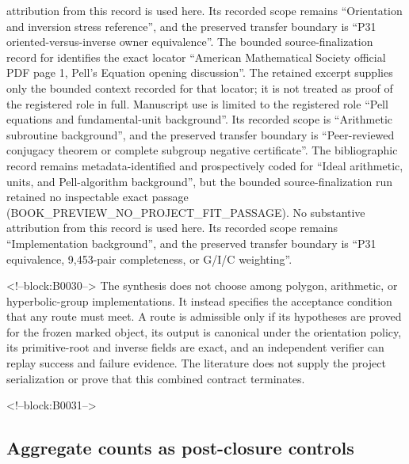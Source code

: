 \documentclass[11pt]{article}
\begin{document}
attribution from this record is used here.  Its recorded scope remains
``Orientation and inversion stress reference'', and the preserved transfer boundary is ``P31 oriented-versus-inverse owner equivalence''.
The bounded source-finalization record for \citep{P31-S19} identifies
the exact locator ``American Mathematical Society official PDF page 1, Pell’s Equation opening discussion''.  The retained excerpt supplies only the
bounded context recorded for that locator; it is not treated as proof of the
registered role in full.  Manuscript use is limited to the registered role ``Pell equations and fundamental-unit background''.
Its recorded scope is ``Arithmetic subroutine background'', and the preserved
transfer boundary is ``Peer-reviewed conjugacy theorem or complete subgroup negative certificate''.
The bibliographic record \citep{P31-S20} remains metadata-identified and
prospectively coded for ``Ideal arithmetic, units, and Pell-algorithm background'', but the bounded source-finalization
run retained no inspectable exact passage (BOOK\_PREVIEW\_NO\_PROJECT\_FIT\_PASSAGE).  No substantive
attribution from this record is used here.  Its recorded scope remains
``Implementation background'', and the preserved transfer boundary is ``P31 equivalence, 9,453-pair completeness, or G/I/C weighting''.

<!--block:B0030-->
The synthesis does not choose among polygon, arithmetic, or
hyperbolic-group implementations. It instead specifies the acceptance
condition that any route must meet. A route is admissible only if its
hypotheses are proved for the frozen marked object, its output is
canonical under the orientation policy, its primitive-root and inverse
fields are exact, and an independent verifier can replay success and
failure evidence. The literature does not supply the project
serialization or prove that this combined contract terminates.

<!--block:B0031-->
\hypertarget{24-aggregate-counts-as-post-closure-controls}{%
\subsection{Aggregate counts as post-closure
controls}\label{24-aggregate-counts-as-post-closure-controls}}
\end{document}

